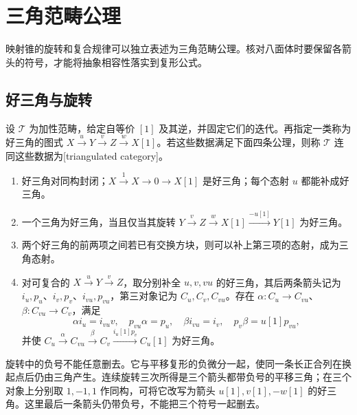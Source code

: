 
\section{三角范畴公理}
\label{b4:sec:1602}

映射锥的旋转和复合规律可以独立表述为三角范畴公理。核对八面体时要保留各箭头的符号，才能将抽象相容性落实到复形公式。


%
%

\subsection{好三角与旋转}
\label{b4:subsec:1602:01}

\begin{definition}\label{b4:def:triangulated-category}
设 \(\mathcal T\) 为加性范畴，给定自等价 \([1]\) 及其逆，并固定它们的迭代。再指定一类称为好三角的图式 \(X\xrightarrow{u}Y\xrightarrow{v}Z\xrightarrow{w}X[1]\)。若这些数据满足下面四条公理，则称 \(\mathcal T\) 连同这些数据为[triangulated category]。
\begin{enumerate}
\item[(TR1)] 好三角对同构封闭；\(X\xrightarrow{1}X\to0\to X[1]\) 是好三角；每个态射 \(u\) 都能补成好三角。
\item[(TR2)] 一个三角为好三角，当且仅当其旋转
\(Y\xrightarrow{v}Z\xrightarrow{w}X[1]\xrightarrow{-u[1]}Y[1]\) 为好三角。
\item[(TR3)] 两个好三角的前两项之间若已有交换方块，则可以补上第三项的态射，成为三角态射。
\item[(TR4)] 对可复合的 \(X\xrightarrow{u}Y\xrightarrow{v}Z\)，取分别补全 \(u,v,vu\) 的好三角，其后两条箭头记为 \(i_u,p_u\)、\(i_v,p_v\)、\(i_{vu},p_{vu}\)，第三对象记为 \(C_u,C_v,C_{vu}\)。存在 \(\alpha:C_u\to C_{vu}\)、\(\beta:C_{vu}\to C_v\)，满足
\[
\alpha i_u=i_{vu}v,\quad p_{vu}\alpha=p_u,\quad
\beta i_{vu}=i_v,\quad p_v\beta=u[1]p_{vu},
\]
并使 \(C_u\xrightarrow{\alpha}C_{vu}\xrightarrow{\beta}C_v\xrightarrow{i_u[1]p_v}C_u[1]\) 为好三角。
\end{enumerate}
\end{definition}

旋转中的负号不能任意删去。它与平移复形的负微分一起，使同一条长正合列在换起点后仍由三角产生。连续旋转三次所得是三个箭头都带负号的平移三角；在三个对象上分别取 \(1,-1,1\) 作同构，可将它改写为箭头 \(u[1],v[1],-w[1]\) 的好三角。这里最后一条箭头仍带负号，不能把三个符号一起删去。

